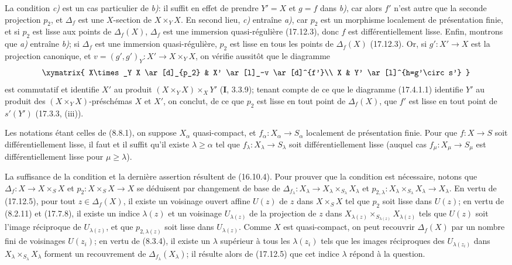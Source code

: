 
La condition \emph{c)} est un cas particulier de \emph{b)}: il suffit en effet de prendre $Y'=X$ et $g=f$ dans \emph{b)}, car alors $f'$ n'est autre que la seconde projection $p_2$, et $\Delta_f$ est une $X$-section de $X\times_YX$. En second lieu, \emph{c)} entraîne \emph{a)}, car $p_2$ est un morphisme localement de présentation finie, et si $p_2$ est lisse aux points de $\Delta_f(X)$, $\Delta_f$ est une immersion quasi-régulière (17.12.3), donc $f$ est différentiellement lisse. Enfin, montrons que \emph{a)} entraîne \emph{b)}; si $\Delta_f$ est une immersion quasi-régulière, $p_2$ est lisse en tous les points de $\Delta_f(X)$ (17.12.3).
Or, si $g':X'\to X$ est la projection canonique, et $v=(g',g')_Y:X'\to X\times_YX$, on vérifie aussitôt que le diagramme
\[
\xymatrix{
  X\times_Y X \ar[d]_{p_2} & X' \ar[l]_-v \ar[d]^{f'}\\
  X & Y' \ar[l]^{h=g'\circ s'}
}
\]
est commutatif et identifie $X'$ au produit $(X\times_YX)\times_XY'$ (\textbf{I}, 3.3.9); tenant compte de ce que le diagramme (17.4.1.1) identifie $Y'$ au produit des $(X\times_YX)$-préschémas $X$ et $X'$, on conclut, de ce que $p_2$ est lisse en tout point de $\Delta_f(X)$, que $f'$ est lisse en tout point de $s'(Y')$ (17.3.3, (iii)).

\begin{corollary}[17.12.6]
\label{IV.17.12.6}
Les notations étant celles de \textup{(8.8.1)}, on suppose $X_\alpha$ quasi-compact, et $f_\alpha:X_\alpha\to S_\alpha$ localement de présentation finie. Pour que $f:X\to S$ soit différentiellement lisse, il faut et il suffit qu'il existe $\lambda\geq\alpha$ tel que $f_\lambda:X_\lambda\to S_\lambda$ soit différentiellement lisse \textup{(}auquel cas $f_\mu:X_\mu\to S_\mu$ est différentiellement lisse pour $\mu\geq\lambda$\textup{)}.
\end{corollary}

La suffisance de la condition et la dernière assertion résultent de (16.10.4). Pour prouver que la condition est nécessaire, notons que $\Delta_f:X\to X\times_SX$ et $p_2:X\times_SX\to X$ se déduisent par changement de base de $\Delta_{f_\lambda}:X_\lambda\to X_\lambda\times_{S_\lambda}X_\lambda$ et $p_{2,\lambda}:X_\lambda\times_{S_\lambda}X_\lambda\to X_\lambda$. En vertu de (17.12.5), pour tout $z\in\Delta_f(X)$, il existe un voisinage ouvert affine $U(z)$ de $z$ dans $X\times_SX$ tel que $p_2$ soit lisse dans $U(z)$; en vertu de (8.2.11) et (17.7.8), il existe un indice $\lambda(z)$ et un voisinage $U_{\lambda(z)}$ de la projection de $z$ dans $X_{\lambda(z)}\times_{S_{\lambda(z)}}X_{\lambda(z)}$ tels que $U(z)$ soit l'image réciproque de $U_{\lambda(z)}$, et que $p_{2,\lambda(z)}$ soit lisse dans $U_{\lambda(z)}$. Comme $X$ est quasi-compact, on peut recouvrir $\Delta_f(X)$ par un nombre fini de voisinages $U(z_i)$; en vertu de (8.3.4), il existe un $\lambda$ supérieur à tous les $\lambda(z_i)$ tels que les images réciproques des $U_{\lambda(z_i)}$ dans $X_\lambda\times_{S_\lambda}X_\lambda$ forment un recouvrement de $\Delta_{f_\lambda}(X_\lambda)$; il résulte alors de (17.12.5) que cet indice $\lambda$ répond à la question.

